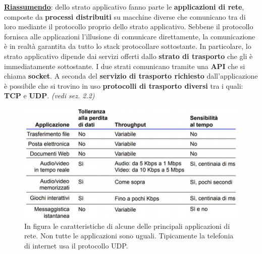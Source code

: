 \documentclass[11pt,a4paper,oneside]{book}
\theoremstyle{definition}
\begin{document}
\textbf{\underline{Riassumendo}}: dello strato applicativo fanno parte le \textbf{applicazioni di rete}, composte da \textbf{processi distribuiti} su macchine diverse che comunicano tra di loro mediante il protocollo proprio dello strato applicativo. Sebbene il protocollo fornisca alle applicazioni l'illusione di comunicare direttamente, la comunicazione è in realtà garantita da tutto lo stack protocollare sottostante. In particolare, lo strato applicativo dipende dai servizi offerti dallo \textbf{strato di trasporto} che gli è immediatamente sottostante. I due strati comunicano tramite una \textbf{API} che si chiama \textbf{socket}.\newline\newline
A seconda del \textbf{servizio di trasporto richiesto} dall'applicazione è possibile che si trovino in uso \textbf{protocolli di trasporto diversi} tra i quali: \textbf{TCP} e \textbf{UDP}. \textit{(vedi sez. 2.2)}
\begin{figure}[!h]
	\includegraphics[scale=0.5]{Immagini/Tcp_udp.png}
	\centering
	\caption{In figura le caratteristiche di alcune delle principali applicazioni di rete. Non tutte le applicazioni sono uguali. Tipicamente la telefonia di internet usa il protocollo UDP.}
\end{figure}
\end{document}
